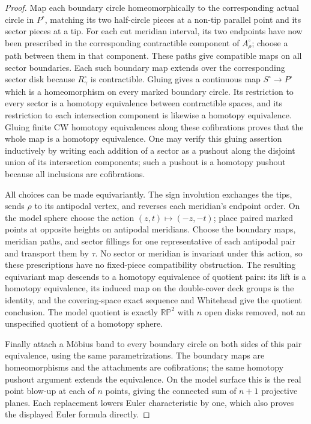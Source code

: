 \begin{proof}
Map each boundary circle homeomorphically to the corresponding actual
circle in $P^\circ$, matching its two half-circle pieces at a non-tip
parallel point and its sector pieces at a tip. For each cut meridian
interval, its two endpoints have now been prescribed in the corresponding
contractible component of $A_\rho^\circ$; choose a path between them in
that component. These paths give compatible maps on all sector boundaries.
Each such boundary map extends over the corresponding sector disk because
$R_\gamma^\circ$ is contractible. Gluing gives a continuous map
$S^\circ\to P^\circ$ which is a homeomorphism on every marked boundary
circle. Its restriction to every sector is a homotopy equivalence between
contractible spaces, and its restriction to each intersection component is
likewise a homotopy equivalence. Gluing finite CW homotopy equivalences
along these cofibrations proves that the whole map is a homotopy
equivalence. One may verify this gluing assertion inductively by writing
each addition of a sector as a pushout along the disjoint union of its
intersection components; such a pushout is a homotopy pushout because all
inclusions are cofibrations.

All choices can be made equivariantly. The sign involution exchanges the
tips, sends $\rho$ to its antipodal vertex, and reverses each meridian's
endpoint order. On the model sphere choose the action $(z,t)\mapsto(-z,-t)$;
place paired marked points at opposite heights on antipodal meridians.
Choose the boundary maps, meridian paths, and sector fillings for one
representative of each antipodal pair and transport them by $\tau$. No
sector or meridian is invariant under this action, so these prescriptions
have no fixed-piece compatibility obstruction. The resulting equivariant
map descends to a homotopy equivalence of quotient pairs: its lift is a
homotopy equivalence, its induced map on the double-cover deck groups is
the identity, and the covering-space exact sequence and Whitehead give
the quotient conclusion. The model quotient is exactly
$\mathbb {RP}^2$ with $n$ open disks removed, not an unspecified quotient
of a homotopy sphere.

Finally attach a M\"obius band to every boundary circle on both sides of
this pair equivalence, using the same parametrizations. The boundary maps
are homeomorphisms and the attachments are cofibrations; the same homotopy
pushout argument extends the equivalence. On the model surface this is the
real point blow-up at each of $n$ points, giving the connected sum of
$n+1$ projective planes. Each replacement lowers Euler characteristic by
one, which also proves the displayed Euler formula directly.
\end{proof}

